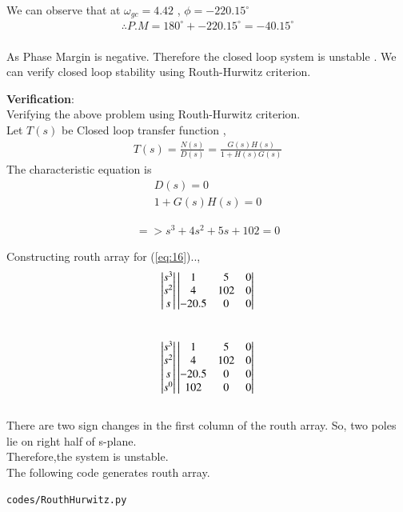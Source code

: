 \begin{enumerate}[label=\thesection.\arabic*.,ref=\thesection.\theenumi]
We can observe that at $\omega_{gc}=4.42$ , $\phi=-220.15^{\circ}$
\\
\begin{align}
\therefore P.M=180^{\circ}+-220.15^{\circ}=-40.15^{\circ} 
\end{align}
\\
As Phase Margin is negative. Therefore the closed loop system is unstable .
We can verify closed loop stability using Routh-Hurwitz criterion.

\textbf{Verification}: \\

Verifying the above problem using Routh-Hurwitz criterion.\\
Let $T(s)$ be Closed loop transfer function ,
\begin{align}
T(s)=\frac{N(s)}{D(s)}=\frac{G(s)H(s)}{1+H(s)G(s)}
\end{align}
The characteristic equation is 
\begin{align}
D(s)=0  \\
1+G(s)H(s)=0 
\end{align}


\begin{align}
=> s^{3}+4s^{2}+5s+102=0   \label{eq:16} 
\end{align}


Constructing routh array for (\ref{eq:16})..,
\begin{align}
\begin{vmatrix}s^3\\s^2\\s\end{vmatrix}
\begin{vmatrix}1 & 5 & 0 \\ 4 & 102 & 0 \\ -20.5 & 0 & 0\end{vmatrix}
\end{align}\\

\begin{align}
\begin{vmatrix}s^3\\s^2\\s\\s^0\end{vmatrix}
\begin{vmatrix}1 & 5 & 0 \\ 4 & 102 & 0 \\ -20.5 & 0 & 0 \\ 102 & 0 & 0\end{vmatrix}
\end{align}\\

There are two sign changes in the first column of the routh array. So, two   poles lie on right half of s-plane. \\
Therefore,the system is unstable.\\
The following code generates routh array.
\begin{lstlisting}
codes/RouthHurwitz.py
\end{lstlisting}




\end{enumerate}
